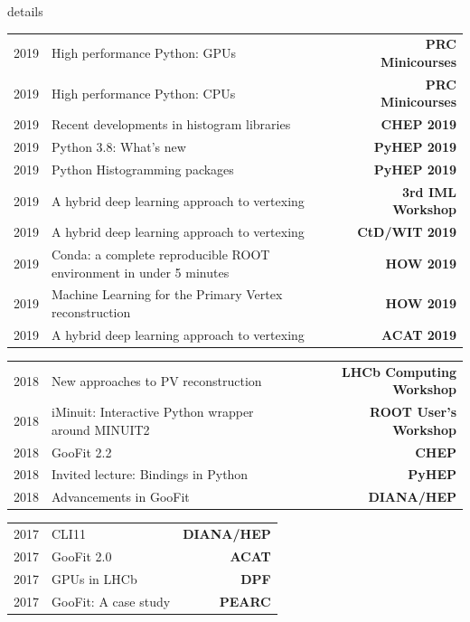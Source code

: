 \documentclass[10pt,letterpaper]{moderncv}
\begin{document}
\begin{taggedblock}{details}
\begin{tabularx}{\textwidth}{p{.33in}>{\raggedright\arraybackslash}X>{\bfseries}r}
    2019 & High performance Python: GPUs & PRC Minicourses \\
    2019 & High performance Python: CPUs & PRC Minicourses \\
    2019 & Recent developments in histogram libraries  & CHEP 2019 \\
    2019 & Python 3.8: What's new & PyHEP 2019 \\
    2019 & Python Histogramming packages & PyHEP 2019\\
    2019 & A hybrid deep learning approach to vertexing & 3rd IML Workshop \\
    2019 & A hybrid deep learning approach to vertexing & CtD/WIT 2019 \\
    2019 & Conda: a complete reproducible ROOT environment in under 5 minutes & HOW 2019 \\
    2019 & Machine Learning for the Primary Vertex reconstruction & HOW 2019 \\
    2019 & A hybrid deep learning approach to vertexing & ACAT 2019 \\ %
\end{tabularx}

\begin{tabularx}{\textwidth}{p{.33in}>{\raggedright\arraybackslash}X>{\bfseries}r}
    2018 & New approaches to PV reconstruction & LHCb Computing Workshop \\ %
    2018 & iMinuit: Interactive Python wrapper around MINUIT2 & ROOT User's Workshop \\  %
    2018 & GooFit 2.2 & CHEP \\ %
    2018 & Invited lecture: Bindings in Python & PyHEP  \\
    2018 & Advancements in GooFit & DIANA/HEP \\
\end{tabularx}

\begin{tabularx}{\textwidth}{p{.33in}>{\raggedright\arraybackslash}X>{\bfseries}r}
    2017 & CLI11 & DIANA/HEP \\
    2017 & GooFit 2.0 & ACAT \\
    2017 & GPUs in LHCb & DPF \\ %
    2017 & GooFit: A case study & PEARC \\


\end{tabularx}
\end{taggedblock}
\end{document}
